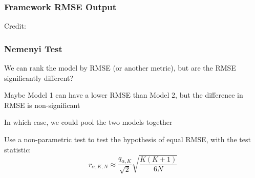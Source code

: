 \documentclass{beamer}
\newenvironment{wideitemize}{\itemize\addtolength{\itemsep}{10pt}}{\enditemize}
\begin{document}
    \begin{frame}
      \frametitle{Framework RMSE Output}
  \hspace*{15pt}\hbox{\scriptsize Credit:}      
    \end{frame}


    \begin{frame}
      \frametitle{Nemenyi Test}

      \begin{wideitemize}
        \item We can rank the model by RMSE (or another metric), but are the RMSE significantly different? 
        \item Maybe Model 1 can have a lower RMSE than Model 2, but the difference in RMSE is non-significant
        \item In which case, we could pool the two models together
        \item Use a non-parametric test to test the hypothesis of equal RMSE, with the test statistic:
          \begin{equation*}
            r_{\alpha, K, N} \approx \frac{q_{\alpha, K}}{\sqrt{2}} \sqrt{\frac{K (K+1)}{6N}}
          \end{equation*}
      \end{wideitemize}      
    \end{frame}
\end{document}

